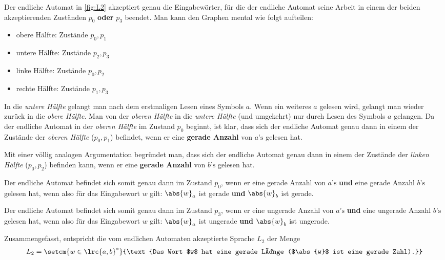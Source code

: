 \begin{myanswer}[myexercise:0401]
	Der endliche Automat in \cref{fig:L2} akzeptiert genau die Eingabewörter, für die der endliche Automat seine Arbeit in einem der beiden akzeptierenden Zuständen $p_0$ \textbf{oder} $p_3$ beendet. Man kann den Graphen mental wie folgt aufteilen:
	\begin{itemize}
		\item obere Hälfte: Zustände $p_0, p_1$
		\item untere Hälfte: Zustände $p_2, p_3$
		\item linke Hälfte: Zustände $p_0, p_2$
		\item rechte Hälfte: Zustände $p_1, p_3$
	\end{itemize}
	In die \textit{untere Hälfte }gelangt man nach dem erstmaligen Lesen eines Symbols $a$. Wenn ein weiteres $a$ gelesen wird, gelangt man wieder zurück in die \textit{obere Hälfte}. Man von der \textit{oberen Hälfte} in die \textit{untere Hälfte} (und umgekehrt) nur durch Lesen des Symbols $a$ gelangen. Da der endliche Automat in der \textit{oberen Hälfte} im Zustand $p_0$ beginnt, ist klar, dass sich der endliche Automat genau dann in einem der Zustände der \textit{oberen Hälfte} ($p_0,p_1$) befindet, wenn er eine \textbf{gerade Anzahl} von $a\text{'s}$ gelesen hat.

	Mit einer völlig analogen Argumentation begründet man, dass sich der endliche Automat genau dann in einem der Zustände der \textit{linken Hälfte} ($p_0,p_2$) befinden kann, wenn er eine \textbf{gerade Anzahl} von $b\text{'s}$ gelesen hat.

	Der endliche Automat befindet sich somit genau dann im Zustand $p_0$, wenn er eine gerade Anzahl von $a\text{'s}$ \textbf{und} eine gerade Anzahl $b\text{'s}$ gelesen hat, wenn also für das Eingabewort $w$ gilt: $\abs{w}_a$ ist gerade \textbf{und} $\abs{w}_b$ ist gerade.

	Der endliche Automat befindet sich somit genau dann im Zustand $p_3$, wenn er eine ungerade Anzahl von $a\text{'s}$ \textbf{und} eine ungerade Anzahl $b\text{'s}$ gelesen hat, wenn also für das Eingabewort $w$ gilt: $\abs{w}_a$ ist ungerade \textbf{und} $\abs{w}_b$ ist ungerade.

	Zusammengefasst, entspricht die vom endlichen Automaten akzeptierte Sprache $L_2$ der Menge
	\begin{align*}
		L_2 = \setcm{w\in\lrc{a,b}^*}{\text{Das Wort $w$ hat eine gerade Länge ($\abs{w}$ ist eine gerade Zahl).}}
	\end{align*}
\end{myanswer}

